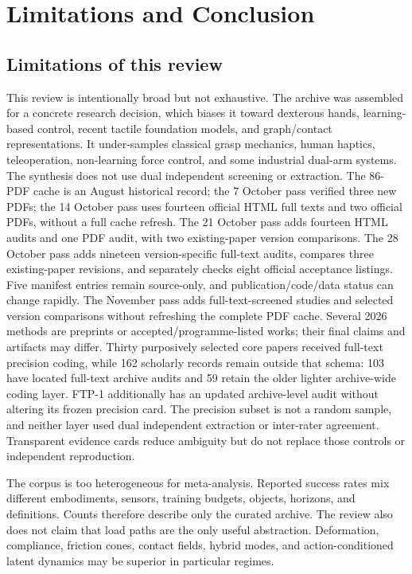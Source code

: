 \section{Limitations and Conclusion}
\label{sec:conclusion}

\subsection{Limitations of this review}

This review is intentionally broad but not exhaustive. The archive was assembled
for a concrete research decision, which biases it toward dexterous hands,
learning-based control, recent tactile foundation models, and graph/contact
representations. It under-samples classical grasp mechanics, human haptics,
teleoperation, non-learning force control, and some industrial dual-arm systems.
The synthesis does not use dual independent screening or extraction. The
86-PDF cache is an August historical record; the 7 October pass verified
three new PDFs; the 14 October pass uses fourteen official HTML full texts and two official PDFs, without a full cache
refresh. The 21 October pass adds fourteen HTML audits and one PDF audit, with
two existing-paper version comparisons. The 28 October pass adds nineteen
version-specific full-text audits, compares three existing-paper revisions, and
separately checks eight official acceptance listings. Five manifest entries remain source-only, and publication/code/data
status can change rapidly. The November pass adds full-text-screened studies
and selected version comparisons without refreshing the complete PDF cache.
Several 2026 methods are preprints or accepted/programme-listed works; their final
claims and artifacts may differ. Thirty purposively selected core papers received
full-text precision coding, while 162 scholarly records remain outside that
schema: 103 have located
full-text archive audits and 59 retain the older lighter
archive-wide coding layer. FTP-1 additionally has an updated archive-level audit
without altering its frozen precision card. The precision subset is not a
random sample, and neither layer used dual independent extraction or inter-rater
agreement. Transparent evidence cards reduce ambiguity but do not replace those
controls or independent reproduction.

The corpus is too heterogeneous for meta-analysis. Reported success rates mix
different embodiments, sensors, training budgets, objects, horizons, and
definitions. Counts therefore describe only the curated archive. The review also
does not claim that load paths are the only useful abstraction. Deformation,
compliance, friction cones, contact fields, hybrid modes, and action-conditioned
latent dynamics may be superior in particular regimes.

